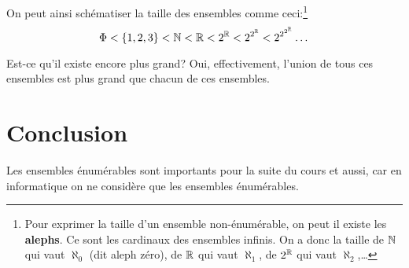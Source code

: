 On peut ainsi schématiser la taille des ensembles comme ceci:\footnote{Pour exprimer la taille d'un ensemble non-énumérable, on peut il existe les \textbf{alephs}. Ce sont les cardinaux des ensembles infinis. On a donc la taille de $\mathbb{N}$ qui vaut $\aleph_0$ (dit aleph zéro), de $\mathbb{R}$ qui vaut $\aleph_1$, de $2^{\mathbb{R}}$ qui vaut $\aleph_2$,\dots }
$$\Phi < \{1,2,3\} < \mathbb{N} < \mathbb{R} < 2^{\mathbb{R}} < 2^{2^{\mathbb{R}}} < 2^{2^{2^{\mathbb{R}}}} \dots$$

Est-ce qu'il existe encore plus grand? Oui, effectivement, l'union de tous ces ensembles 
est plus grand que chacun de ces ensembles.


\section{Conclusion}
\label{sec:concept_conclusion}

Les ensembles énumérables sont importants pour la suite du cours et aussi, car en
informatique on ne considère que les ensembles énumérables.

